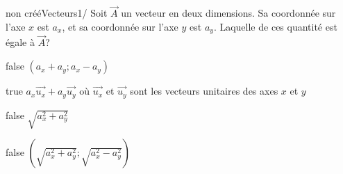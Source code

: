         	\begin{question}{non créé}{Vecteurs}{1}{/}
				Soit $\vec{A}$ un vecteur en deux dimensions. Sa coordonnée sur l'axe $x$ est $a_x$, et sa coordonnée sur l'axe $y$ est $a_y$. Laquelle de ces quantité est égale à $\vec{A}$?
            \end{question}
            \begin{reponses}
            	\item[false] $(a_x+a_y;a_x-a_y)$
            	\item[true] $a_x\vec{u_x}+a_y\vec{u_y}$ où $\vec{u_x}$ et $\vec{u_y}$ sont les vecteurs unitaires des axes $x$ et $y$
                \item[false] $\sqrt{a_{x}^2+a_{y}^2}$
                \item[false] $(\sqrt{a_{x}^2+a_{y}^2};\sqrt{a_{x}^2-a_{y}^2})$
            \end{reponses}
